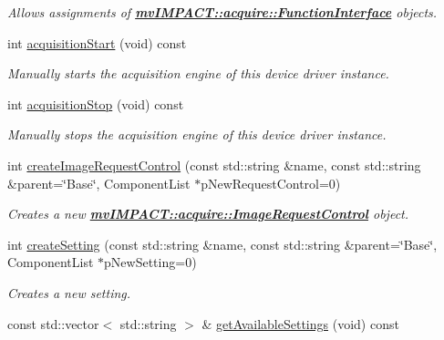 \begin{DoxyCompactItemize}
\begin{DoxyCompactList}\small\item\em Allows assignments of {\bfseries \hyperlink{classmv_i_m_p_a_c_t_1_1acquire_1_1_function_interface}{mv\+I\+M\+P\+A\+C\+T\+::acquire\+::\+Function\+Interface}} objects. \end{DoxyCompactList}\item 
int \hyperlink{classmv_i_m_p_a_c_t_1_1acquire_1_1_function_interface_a91750ec88416ca6557b1bbb10ebc5039}{acquisition\+Start} (void) const 
\begin{DoxyCompactList}\small\item\em Manually starts the acquisition engine of this device driver instance. \end{DoxyCompactList}\item 
int \hyperlink{classmv_i_m_p_a_c_t_1_1acquire_1_1_function_interface_ab52b63727aa33cb4cc2bdd0856c0f237}{acquisition\+Stop} (void) const 
\begin{DoxyCompactList}\small\item\em Manually stops the acquisition engine of this device driver instance. \end{DoxyCompactList}\item 
int \hyperlink{classmv_i_m_p_a_c_t_1_1acquire_1_1_function_interface_a64b15537a09e6bb887075b15cba2c90b}{create\+Image\+Request\+Control} (const std\+::string \&name, const std\+::string \&parent=\char`\"{}Base\char`\"{}, Component\+List $\ast$p\+New\+Request\+Control=0)
\begin{DoxyCompactList}\small\item\em Creates a new {\bfseries \hyperlink{classmv_i_m_p_a_c_t_1_1acquire_1_1_image_request_control}{mv\+I\+M\+P\+A\+C\+T\+::acquire\+::\+Image\+Request\+Control}} object. \end{DoxyCompactList}\item 
int \hyperlink{classmv_i_m_p_a_c_t_1_1acquire_1_1_function_interface_a17e85331ed0965a52cff8b62279ef40c}{create\+Setting} (const std\+::string \&name, const std\+::string \&parent=\char`\"{}Base\char`\"{}, Component\+List $\ast$p\+New\+Setting=0)
\begin{DoxyCompactList}\small\item\em Creates a new setting. \end{DoxyCompactList}\item 
const std\+::vector$<$ std\+::string $>$ \& \hyperlink{classmv_i_m_p_a_c_t_1_1acquire_1_1_function_interface_a272042e5f2ac48dbce329b736e576aad}{get\+Available\+Settings} (void) const 

\end{DoxyCompactItemize}

